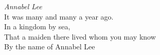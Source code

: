 \documentclass{article}
\begin{document}
\emph{Annabel Lee}\\
It was many and many a year ago.\\[2mm]
In a kingdom by sea,\\
That a maiden there lived whom you may know\\
By the name of Annabel Lee
\end{document}
